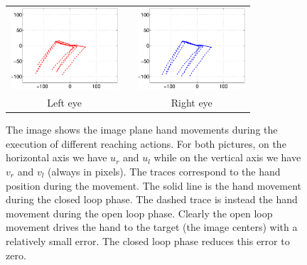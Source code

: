 \begin{figure}
  \begin{center}
	\begin{tabular}{ccc}
	  \parbox{40mm}{\includegraphics[width=40mm]{Figure/LeftEyeOpenClosedLoop.eps}}  & \hspace{2cm} &
	  \parbox{40mm}{\includegraphics[width=40mm]{Figure/RightEyeOpenClosedLoop.eps}}
	  \\
	  \parbox{40mm}{\centering Left eye } & \hspace{2cm} & \parbox{40mm}{\centering Right eye }
  \end{tabular}
\end{center}
\caption{The image shows the image plane hand movements during the execution 
of different reaching actions. For both pictures, on the horizontal axis 
we have $u_r$ and $u_l$ while on the vertical axis we have $v_r$ and $v_l$ (always in pixels).
The traces correspond to the hand position during the movement. The solid line is the hand movement
during the closed loop phase. The dashed trace is instead the hand movement during the open loop 
phase. Clearly the open loop movement drives the hand to the target (the image centers) with a 
relatively small error. The closed loop phase reduces this error to zero.}\label{Fig:TimeResponseOpenClosedLoopErrors}
  \end{figure}
  

